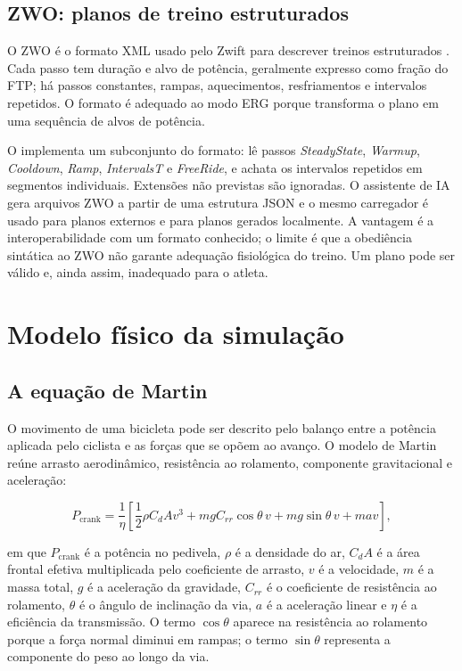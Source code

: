 \subsection{ZWO: planos de treino estruturados}
\label{sec:zwo}

O ZWO é o formato XML usado pelo Zwift para descrever treinos estruturados
\cite{zwift2024}. Cada passo tem duração e alvo de potência, geralmente expresso
como fração do FTP; há passos constantes, rampas, aquecimentos, resfriamentos e
intervalos repetidos. O formato é adequado ao modo ERG porque transforma o plano
em uma sequência de alvos de potência.

O \argus{} implementa um subconjunto do formato: lê passos
\textit{SteadyState}, \textit{Warmup}, \textit{Cooldown}, \textit{Ramp},
\textit{IntervalsT} e \textit{FreeRide}, e achata os intervalos repetidos em
segmentos individuais. Extensões não previstas são ignoradas. O assistente de
IA gera arquivos ZWO a partir de uma estrutura JSON e o mesmo carregador é usado
para planos externos e para planos gerados localmente. A vantagem é a
interoperabilidade com um formato conhecido; o limite é que a obediência
sintática ao ZWO não garante adequação fisiológica do treino. Um plano pode ser
válido e, ainda assim, inadequado para o atleta.

\section{Modelo físico da simulação}
\label{sec:equacao-martin}

\subsection{A equação de Martin}
\label{sec:equacao-martin-formal}

O movimento de uma bicicleta pode ser descrito pelo balanço entre a potência
aplicada pelo ciclista e as forças que se opõem ao avanço. O modelo de Martin
\cite{martin1998} reúne arrasto aerodinâmico, resistência ao rolamento,
componente gravitacional e aceleração:

\begin{equation}\label{eq:martin}
P_{\text{crank}} = \frac{1}{\eta}\left[
\frac{1}{2}\rho C_d A v^3
+ m g C_{rr}\cos\theta\,v
+ m g\sin\theta\,v
+ m a v
\right],
\end{equation}

\noindent em que $P_{\text{crank}}$ é a potência no pedivela, $\rho$ é a
densidade do ar, $C_dA$ é a área frontal efetiva multiplicada pelo coeficiente
de arrasto, $v$ é a velocidade, $m$ é a massa total, $g$ é a aceleração da
gravidade, $C_{rr}$ é o coeficiente de resistência ao rolamento, $\theta$ é o
ângulo de inclinação da via, $a$ é a aceleração linear e $\eta$ é a eficiência
da transmissão. O termo $\cos\theta$ aparece na resistência ao rolamento porque
a força normal diminui em rampas; o termo $\sin\theta$ representa a componente
do peso ao longo da via.

